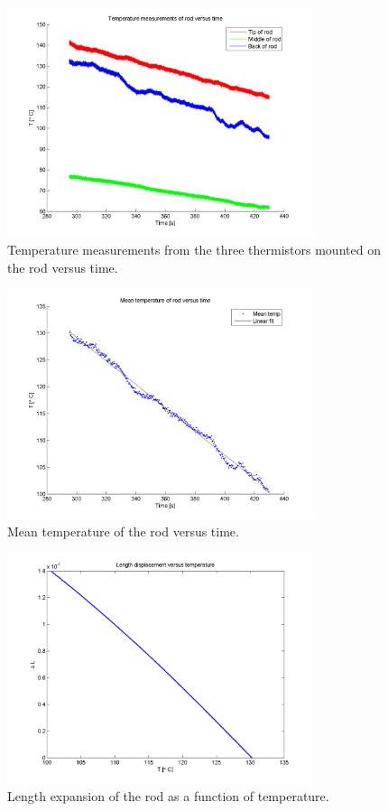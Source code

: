 \begin{figure}[htb]
	\centering
	\includegraphics[width=0.8\textwidth]{img/temp_tit.png}
	\caption{Temperature measurements from the three thermistors mounted on the rod versus time.}
	\label{fig:results:6}
\end{figure}

\begin{figure}[htb]
	\centering
	\includegraphics[width=0.8\textwidth]{img/mtemp_tit.png}
	\caption{Mean temperature of the rod versus time.}
	\label{fig:results:7}
\end{figure}

\begin{figure}[htb]
	\centering
	\includegraphics[width=0.8\textwidth]{img/dl_tit.png}
	\caption{Length expansion of the rod as a function of 		temperature.}
	\label{fig:results:8}
\end{figure}

